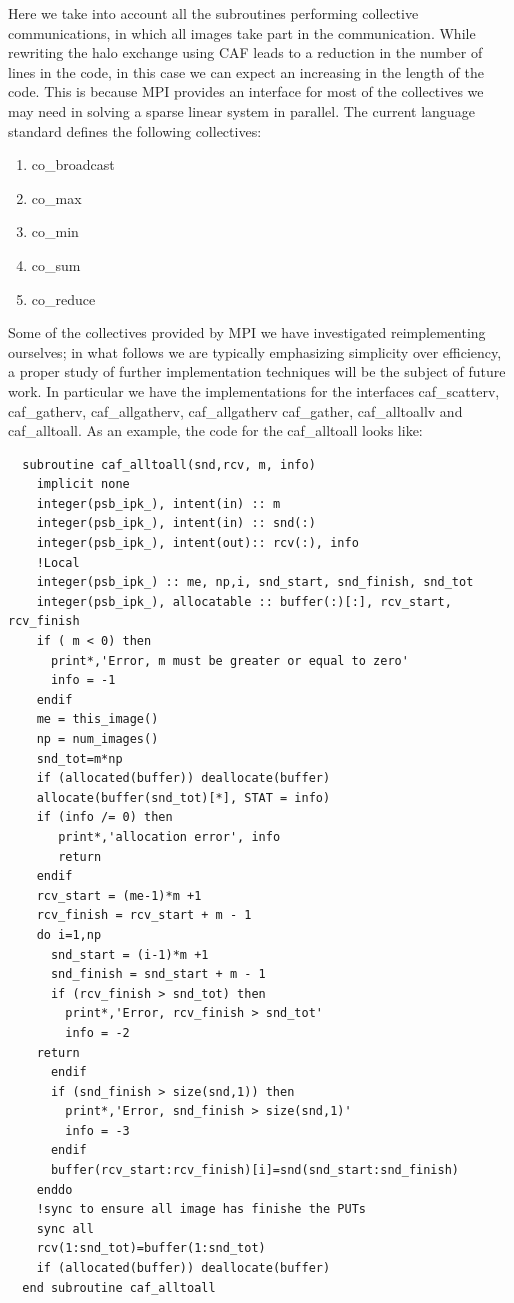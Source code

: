 \documentclass{IOS-Book-Article}
\begin{document}
Here we take into account all the subroutines performing collective
communications, in which all images take part in the
communication. While rewriting the halo exchange using CAF leads to a
reduction in the number of lines in the code, in this case we can
expect an increasing in the length of the code. This is because MPI
provides an interface for most of the collectives we may need in
solving a sparse linear system in parallel.
The current language standard defines the following collectives:
\begin{enumerate}
\item co\_broadcast
\item co\_max
\item co\_min
\item co\_sum
\item co\_reduce
\end{enumerate}
Some of the collectives provided by MPI  we have investigated
reimplementing ourselves; in what follows we are typically emphasizing
simplicity over efficiency, a proper study of further implementation
techniques will be the subject of future work. In particular 
we have the implementations for the interfaces caf\_scatterv,
caf\_gatherv, caf\_allgatherv, caf\_allgatherv caf\_gather,
caf\_alltoallv and caf\_alltoall.  
As an example, the code for the caf\_alltoall looks like:
\lstset{language=Fortran} 
{\small
\begin{lstlisting}
  subroutine caf_alltoall(snd,rcv, m, info)
    implicit none
    integer(psb_ipk_), intent(in) :: m
    integer(psb_ipk_), intent(in) :: snd(:)
    integer(psb_ipk_), intent(out):: rcv(:), info
    !Local
    integer(psb_ipk_) :: me, np,i, snd_start, snd_finish, snd_tot
    integer(psb_ipk_), allocatable :: buffer(:)[:], rcv_start, rcv_finish
    if ( m < 0) then
      print*,'Error, m must be greater or equal to zero'
      info = -1
    endif
    me = this_image()
    np = num_images()
    snd_tot=m*np
    if (allocated(buffer)) deallocate(buffer)
    allocate(buffer(snd_tot)[*], STAT = info)
    if (info /= 0) then
       print*,'allocation error', info
       return
    endif
    rcv_start = (me-1)*m +1
    rcv_finish = rcv_start + m - 1
    do i=1,np
      snd_start = (i-1)*m +1 
      snd_finish = snd_start + m - 1
      if (rcv_finish > snd_tot) then
        print*,'Error, rcv_finish > snd_tot'
        info = -2 
	return
      endif
      if (snd_finish > size(snd,1)) then
        print*,'Error, snd_finish > size(snd,1)'
        info = -3 
      endif
      buffer(rcv_start:rcv_finish)[i]=snd(snd_start:snd_finish)
    enddo
    !sync to ensure all image has finishe the PUTs 
    sync all
    rcv(1:snd_tot)=buffer(1:snd_tot)
    if (allocated(buffer)) deallocate(buffer)
  end subroutine caf_alltoall
\end{lstlisting}}
\end{document}
